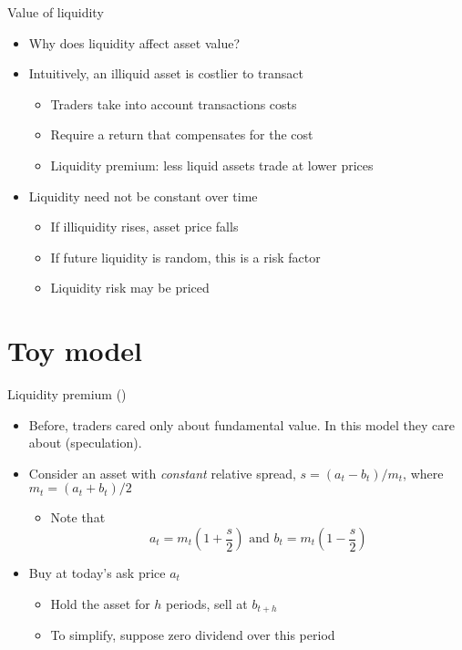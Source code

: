 \documentclass[english,10pt
,aspectratio=169
]{beamer}
\begin{document}
\begin{frame}{Value of liquidity}
	\begin{itemize}
		\item Why does liquidity affect asset value?
		\item Intuitively, an illiquid asset is costlier to transact
		\begin{itemize}
			\item Traders take into account transactions costs
			\item Require a return that compensates for the cost
			\item Liquidity premium: less liquid assets trade at lower prices
		\end{itemize}
		\item Liquidity need not be constant over time
		\begin{itemize}
			\item If illiquidity rises, asset price falls
			\item If future liquidity is random, this is a risk factor
			\item Liquidity risk may be priced
		\end{itemize}
	\end{itemize}
\end{frame}



\section{Toy model}

\begin{frame}{Liquidity premium (\cite{amihud_asset_1986})}
	\begin{itemize}
		\item Before, traders cared only about fundamental value. In this model they care about  (speculation).
		\item Consider an asset with \emph{constant} relative spread, $s=(a_t-b_t)/m_t$, where $m_t=(a_t+b_t)/2$
		\begin{itemize}
			\item Note that
			\[
			a_t=m_t \left(1+\frac{s}{2}\right) \text{ and } b_t=m_t\left(1-\frac{s}{2}\right)
			\]
		\end{itemize}
		\item Buy at today's ask price $a_t$
		\begin{itemize}
			\item Hold the asset for $h$ periods, sell at $b_{t+h}$
			\item To simplify, suppose zero dividend over this period
		\end{itemize}
	\end{itemize}
\end{frame}
\end{document}
